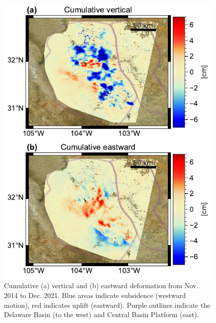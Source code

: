 \begin{figure}[!ht]
	\centering
	\includegraphics[height=.85\textheight]{figures/chapter5-lowess/figure-results-east-up-clipped.pdf}
	\caption[Cumulative 7-year vertical and eastward deformation]{
		Cumulative (a) vertical and (b) eastward deformation from Nov. 2014 to Dec. 2021. Blue areas indicate subsidence (westward motion), red indicates uplift (eastward). Purple outlines indicate the Delaware Basin (to the west) and Central Basin Platform (east).
	}
	\label{fig:ch5-results-east-up}
\end{figure}




